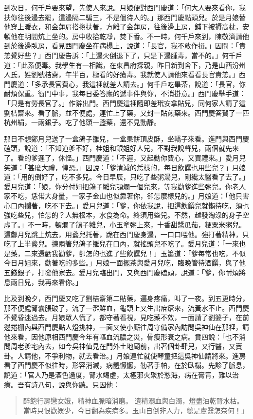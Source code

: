 到次日，何千戶要來望，先使人來說。月娘便對西門慶道：「何大人要來看你，我扶你往後邊去罷，這邊隔二騙三，不是個待人的。」那西門慶點頭兒。於是月娘替他穿上暖衣，和金蓮肩搭搊扶著，方離了金蓮房，往後邊上房，鋪下被褥高枕，安頓他在明間炕上坐的。房中收拾乾凈，焚下香。不一時，何千戶來到，陳敬濟請他到於後邊臥房，看見西門慶坐在病榻上，說道：「長官，我不敢作揖。」因問：「貴恙覺好些？」西門慶告訴：「上邊火倒退下了，只是下邊腫毒，當不的。」何千戶道：「此系便毒。我學生有一相識，在東昌府探親，昨日新到舍下，乃是山西汾州人氏，姓劉號桔齋，年半百，極看的好瘡毒。我就使人請他來看看長官貴恙。」西門慶道：「多承長官費心，我這裡就差人請去。」何千戶吃畢茶，說道：「長官，你耐煩保重。衙門中事，我每日委答應的遞事件與你，不消掛意。」西門慶舉手道：「只是有勞長官了。」作辭出門。西門慶這裡隨即差玳安拿貼兒，同何家人請了這劉桔齋來。看了脈，並不便處，連忙上了藥，又封一貼煎藥來。西門慶答賀了一匹杭州絹，一兩銀子。吃了他頭一盞藥，還不見動靜。

那日不想鄭月兒送了一盒鴿子雛兒，一盒果餅頂皮酥，坐轎子來看。進門與西門慶磕頭，說道：「不知道爹不好，桂姐和銀姐好人兒，不對我說聲兒，兩個就先來了。看的爹遲了，休怪。」西門慶道：「不遲，又起動你費心，又買禮來。」愛月兒笑道：「甚麼大禮，惶恐。」因說：「爹清減的恁樣的，每日飲饌也用些兒？」月娘道：「用的倒好了，吃不多兒。今日早辰，只吃了些粥湯兒，剛纔太醫看了去了。」愛月兒道：「娘，你分付姐把鴿子雛兒頓爛一個兒來，等我勸爹進些粥兒。你老人家不吃，恁偌大身量，一家子金山也似靠著你，卻怎麼樣兒的。」月娘道：「他只害心口內攔著，吃不下去。」愛月兒道：「爹，你依我說，把這飲饌兒就懶待吃，須也強吃些兒，怕怎的？人無根本，水食為命。終須用些兒。不然，越發淘淥的身子空虛了。」不一時，頓爛了鴿子雛兒，小玉拿粥上來，十香甜醬瓜茄，粳粟米粥兒。這鄭月兒跳上炕去，用盞兒托著，跪在西門慶身邊，一口口喂他。強打著精神，只吃了上半盞兒。揀兩箸兒鴿子雛兒在口內，就搖頭兒不吃了。愛月兒道：「一來也是藥，二來還虧我勸爹，卻怎的也進了些飲饌兒！」玉簫道：「爹每常也吃，不似今日月姐來，勸著吃的多些。」月娘一面擺茶與愛月兒吃，臨晚管待酒饌，與了他五錢銀子，打發他家去。愛月兒臨出門，又與西門慶磕頭，說道：「爹，你耐煩將息兩日兒，我再來看你。」

比及到晚夕，西門慶又吃了劉桔齋第二貼藥，遍身疼痛，叫了一夜。到五更時分，那不便處腎囊脹破了，流了一灘鮮血，龜頭上又生出疳瘡來，流黃水不止。西門慶不覺昏迷過去。月娘眾人慌了，都守著看視，見吃藥不效，一面請了劉婆子，在前邊捲棚內與西門慶點人燈挑神，一面又使小廝往周守備家內訪問吳神仙在那裡，請他來看，因他原相西門慶今年有嘔血流膿之災，骨瘦形衰之病。賁四說：「也不消問周老爹宅內去，如今吳神仙見在門外土地廟前，出著個卦肆兒，又行醫，又賣卦。人請他，不爭利物，就去看治。」月娘連忙就使琴童把這吳神仙請將來。進房看了西門慶不似往時，形容消減，病體懨懨，勒著手帕，在於臥榻。先診了脈息，說道：「官人乃是酒色過度，腎水竭虛，太極邪火聚於慾海，病在膏肓，難以治療。吾有詩八句，說與你聽。只因他：
\begin{quote}
醉飽行房戀女娥，精神血脈暗消磨。
遺精溺血與白濁，燈盡油乾腎水枯。
當時只恨歡娛少，今日翻為疾病多。玉山自倒非人力，總是盧醫怎奈何！」
\end{quote}

